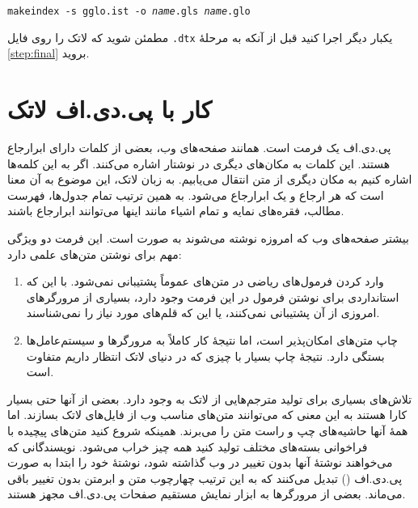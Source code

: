 {\noindent
\setLR

\texttt{makeindex -s gglo.ist -o \textit{name}.gls \textit{name}.glo}

\setRL

\noindent مطمئن شوید که لاتک را روی فایل \texttt{.dtx} یکبار دیگر اجرا کنید قبل از آنکه به مرحلهٔ 
\ref{step:final} بروید.



\section{کار با پی.دی.اف لاتک}\label{sec:pdftex}
پی.دی.اف یک فرمت 
%
 است. همانند صفحه‌های وب، بعضی از کلمات دارای ابرارجاع هستند. این کلمات به مکان‌های دیگری در نوشتار‌ اشاره می‌کنند. اگر به این کلمه‌ها اشاره کنیم به مکان دیگری از متن انتقال می‌یابیم. به زبان لاتک، این موضوع به آن معنا است که هر ارجاع   و  یک ابرارجاع می‌شود. به همین ترتیب تمام جدول‌ها، فهرست مطالب، فقره‌های نمایه و تمام اشیاء مانند اینها می‌توانند ابرارجاع باشند.

بیشتر صفحه‌های وب که امروزه نوشته می‌شوند به صورت  است. این فرمت دو ویژگی مهم برای نوشتن متن‌های علمی دارد:
\begin{enumerate}
\item وارد کردن فرمول‌های ریاضی در متن‌های  عموماً پشتیبانی نمی‌شود. با این که استانداردی برای نوشتن فرمول در این فرمت وجود دارد، بسیاری از مرورگرهای امروزی از آن پشتیبانی نمی‌کنند، یا این که قلم‌های مورد نیاز را نمی‌شناسند.
\item چاپ متن‌های  امکان‌پذیر است، اما نتیجهٔ کار کاملاً به مرورگرها و سیستم‌عامل‌ها بستگی دارد. نتیجهٔ چاپ بسیار با چیزی که در دنیای لاتک انتظار داریم متفاوت است.
\end{enumerate}

تلاش‌های بسیاری برای تولید مترجم‌هایی از لاتک به  وجود دارد. بعضی از آنها حتی بسیار کارا هستند به این معنی که می‌توانند متن‌های مناسب وب از فایل‌های لاتک بسازند. اما همهٔ آنها حاشیه‌های چپ و راست متن را می‌برند. همینکه شروع کنید متن‌های پیچیده با فراخوانی بسته‌های مختلف تولید کنید همه چیز خراب می‌شود. نویسندگانی که می‌خواهند نوشتهٔ آنها بدون تغییر در وب گذاشته شود، نوشتهٔ خود را ابتدا به صورت پی.دی.اف () تبدیل می‌کنند که به این ترتیب چهارچوب متن و ابرمتن بدون تغییر باقی می‌ماند. بعضی از مرورگرها به ابزار نمایش مستقیم صفحات پی.دی.اف مجهز هستند.

}
